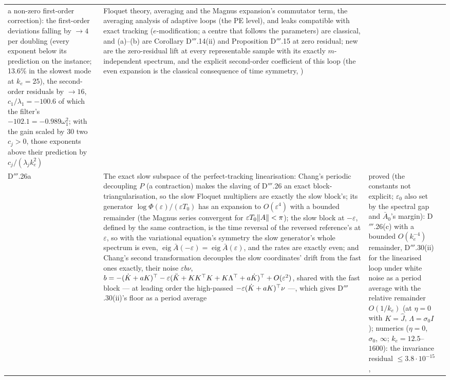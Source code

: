 {\begin{longtable}{@{}>{\raggedright\arraybackslash}p{}>{\raggedright\arraybackslash}p{}%
>{\raggedright\arraybackslash}p{}>{\raggedright\arraybackslash}p{}@{}}
a non-zero first-order correction): the first-order deviations falling by $\to4$ per doubling (every exponent below
its prediction on the instance; 13.6\% in the slowest mode at $k_e = 25$), the second-order residuals by $\to16$,
$c_1/\lambda_1 = -100.6$ of which the filter's $-102.1 = -0.989\omega_1^2$; with the gain scaled by 30 two
$c_j > 0$, those exponents above their prediction by $c_j/(\lambda_jk_e^2)$
& Floquet theory, averaging and the Magnus expansion's commutator term, the averaging analysis of adaptive loops (the
PE level), and leaks compatible with exact tracking ($e$-modification; a centre that follows the parameters) are
classical, and (a)--(b) are Corollary D$'''$.14(ii) and Proposition D$'''$.15 at zero residual; new are the
zero-residual lift at every representable sample with its exactly $m$-independent spectrum, and the explicit
second-order coefficient of this loop (the even expansion is the classical consequence of time symmetry,
\cite{S56})\\
\addlinespace[0.5pt]
D$'''$.\allowbreak26a & The exact slow subspace of the perfect-tracking linearisation: Chang's periodic decoupling $P$ (a
contraction) makes the slaving of D$'''$.26 an exact block-triangularisation, so the slow Floquet multipliers are
exactly the slow block's; its generator $\log\Phi(\varepsilon)/(\varepsilon T_0)$ has an expansion to
$O(\varepsilon^4)$ with a bounded remainder (the Magnus series convergent for $\varepsilon T_0\lVert A\rVert < \pi$); the
slow block at $-\varepsilon$, defined by the same contraction, is the time reversal of the reversed reference's at
$\varepsilon$, so with the variational equation's symmetry the slow generator's whole spectrum is even,
$\operatorname{eig}\bar A(-\varepsilon) = \operatorname{eig}\bar A(\varepsilon)$, and the rates are exactly even; and
Chang's second transformation decouples the slow coordinates' drift from the fast ones exactly, their noise
$\varepsilon b\nu$,
$b = -(\dot K + aK)^\top - \varepsilon(\ddot K + KK^\top K + K\Lambda^\top + a\dot K)^\top + O(\varepsilon^2)$, shared with
the fast block --- at leading order the high-passed $-\varepsilon(\dot K + aK)^\top\nu$ ---, which gives D$'''$.30(ii)'s
floor as a period average
& proved (the constants not explicit; $\varepsilon_0$ also set by the spectral gap and $\bar A_0$'s margin):
D$'''$.26(c) with a bounded $O(k_e^{-4})$ remainder, D$'''$.30(ii) for the linearised loop under white noise as a
period average with the relative remainder $O(1/k_e)$ (at $\eta = 0$ with $K = \hat J$, $\Lambda = \sigma_0I$);
numerics ($\eta = 0$, $\sigma_0$, $\infty$; $k_e = 12.5$--$1600$): the invariance residual $\le3.8\cdot10^{-15}$,

\end{longtable}}
